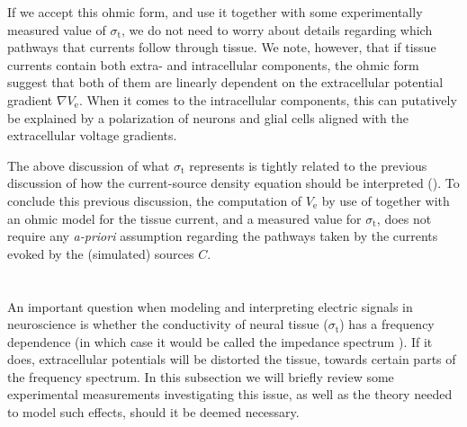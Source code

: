 If we accept this ohmic form, and use it together with some experimentally measured value of $\sigma_\text{t}$, 
we do not need to worry about details regarding which pathways that currents follow through tissue. 
We note, however, that if tissue currents contain both extra- and intracellular components, 
the ohmic form suggest that both of them are linearly dependent on the extracellular
potential gradient $\nabla V_\text{e}$. When it comes to the intracellular components, 
this can putatively be explained by a polarization of neurons and glial cells
aligned with  the extracellular voltage gradients. 

The above discussion of what $\sigma_\text{t}$ represents is tightly related to the previous discussion
of how the current-source density equation should be interpreted ().
To conclude this previous discussion, the computation of $V_\text{e}$ by use of  together with 
an ohmic model for the tissue current, and a measured value for $\sigma_\text{t}$, 
does not require any \textit{a-priori}   assumption regarding the pathways 
taken by the currents evoked by the (simulated) sources $C$.


\section{}
\label{sec:Sigma:f-independent}
An important question when modeling and interpreting electric signals in neuroscience 
is whether the conductivity of neural tissue ($\sigma_\text{t}$) has a frequency dependence 
(in which case it would be called the impedance spectrum ). 
If it does, extracellular potentials will be distorted  the tissue, 
 towards certain parts of the frequency spectrum. 
In this subsection we will briefly review some experimental measurements investigating this issue, 
as well as the theory needed to model such effects, should it be deemed necessary.

